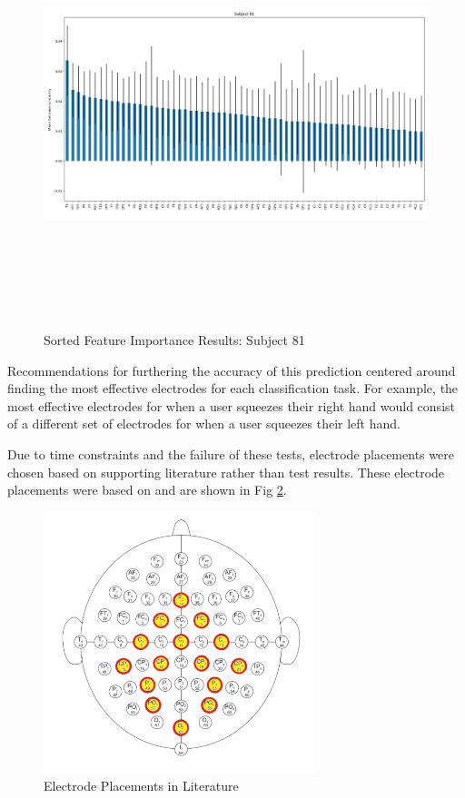 \documentclass[conference]{IEEEtran}
\begin{document}
    \begin{figure}[htbp]
            \centerline{\includegraphics[height=4.9in, keepaspectratio, angle=270]{figs/F/sub81_feat_import.png}}
            \caption{Sorted Feature Importance Results: Subject 81}
            \label{fig:sub81}
    \end{figure} 
    \twocolumn

    Recommendations for furthering the accuracy of this prediction centered around finding the most effective electrodes for each classification task. For example, the most effective electrodes for when a user squeezes their right hand would consist of a different set of electrodes for when a user squeezes their left hand.  

    Due to time constraints and the failure of these tests, electrode placements were chosen based on supporting literature rather than test results. These electrode placements were based on \cite{method_of_electrode_selection, usable_out_of_box} and are shown in Fig \ref{fig:correct_placements}.

    \begin{figure}[htbp]
            \centerline{\includegraphics[height=3in, keepaspectratio]{figs/F/correct_placements.png}}
            \caption{Electrode Placements in Literature}
            \label{fig:correct_placements}
    \end{figure} 
\end{document}
